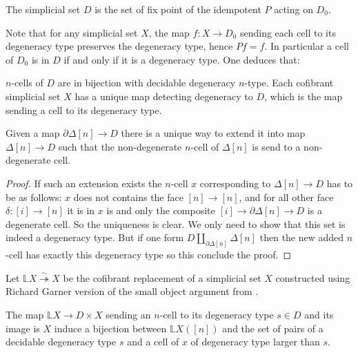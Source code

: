 \documentclass[reqno,10pt,a4paper,oneside,draft]{amsart}
\begin{document}
\begin{definition}
The simplicial set $D$ is the set of fix point of the idempotent $P$ acting on $D_0$.
\end{definition}

Note that for any simplicial set $X$, the map $f:X \rightarrow D_0$ sending each cell to its degeneracy type preserves the degeneracy type, hence $P f = f$. In particular a cell of $D_0$ is in $D$ if and only if it is a degeneracy type. One deduces that:

\begin{lemma}
$n$-cells of $D$ are in bijection with decidable degeneracy $n$-type. Each cofibrant simplicial set $X$ has a unique map detecting degeneracy to $D$, which is the map sending a cell to its degeneracy type.
\end{lemma}



\begin{lemma} \label{lem:D_contractible}
Given a map $\partial \Delta[n] \rightarrow D$ there is a unique way to extend it into map $\Delta[n] \rightarrow D$ such that the non-degenerate $n$-cell of $\Delta[n]$ is send to a non-degenerate cell.
\end{lemma}

\begin{proof}
If such an extension exists the $n$-cell $x$ corresponding to $\Delta[n] \rightarrow D$ has to be as follows: $x$ does not contains the face $[n] \rightarrow [n]$, and for all other face $\delta:[i] \rightarrow [n]$ it is in $x$ is and only the composite $[i] \rightarrow \partial \Delta[n] \rightarrow D$ is a degenerate cell. So the uniqueness is clear. We only need to show that this set is indeed a degeneracy type. But if one form $D \coprod_{\partial \Delta[n]} \Delta[n]$ then the new added $n$-cell has exactly this degeneracy type so this conclude the proof.
\end{proof}

Let $\mathbb{L} X \overset{\sim}{\twoheadrightarrow} X $ be the cofibrant replacement of a simplicial set $X$ constructed using Richard Garner version of the small object argument from \cite{garner:small-object-argument}.

\begin{proposition} \label{prop:Cof_replacement}
The map $\mathbb{L} X \rightarrow D \times X$ sending an $n$-cell to its degeneracy type $s \in D$ and its image is $X$ induce a bijection between $\mathbb{L}X([n])$ and the set of pairs of a decidable degeneracy type $s$ and a cell of $x$ of degeneracy type larger than $s$.
\end{proposition}
\end{document}
